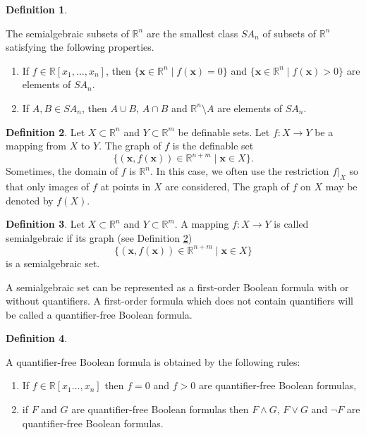 \documentclass[
]{book}
\providecommand{\tightlist}{%
  \setlength{\itemsep}{0pt}\setlength{\parskip}{0pt}}
\theoremstyle{definition}
\newtheorem{definition}{Definition}[chapter]
\theoremstyle{definition}
\theoremstyle{definition}
\theoremstyle{definition}
\theoremstyle{remark}
\begin{document}
\begin{definition}
\protect\hypertarget{def:semialgebraic-set}{}\label{def:semialgebraic-set}

The semialgebraic subsets of \(\mathbb{R}^n\) are the smallest class \({SA}_n\) of subsets of \(\mathbb{R}^n\) satisfying the following properties.

\begin{enumerate}
\def\labelenumi{\arabic{enumi}.}
\tightlist
\item
  If \(f \in \mathbb{R}[x_1,\ldots,x_n]\), then \(\{ \mathbf{x} \in \mathbb{R}^n \mid f(\mathbf{x}) = 0 \}\) and \(\{ \mathbf{x} \in \mathbb{R}^n \mid f(\mathbf{x}) > 0 \}\) are elements of \({SA}_n\).
\item
  If \(A, B \in {SA}_n\), then \(A \cup B\), \(A \cap B\) and \(\mathbb{R}^n \setminus A\) are elements of \({SA}_n\).
\end{enumerate}

\end{definition}

\begin{definition}
\protect\hypertarget{def:graph-def-map}{}\label{def:graph-def-map}Let \(X \subset \mathbb{R}^n\) and \(Y \subset \mathbb{R}^m\) be definable sets.
Let \(f : X \to Y\) be a mapping from \(X\) to \(Y\). The graph of \(f\) is the definable set
\[
\{ (\mathbf{x},f(\mathbf{x})) \in \mathbb{R}^{n+m} \mid \mathbf{x} \in X \}.
\]
Sometimes, the domain of \(f\) is \(\mathbb{R}^n\). In this case, we often use the restriction \(f\vert_X\) so that only images of \(f\) at points in \(X\) are considered,
The graph of \(f\) on \(X\) may be denoted by \(f(X)\).
\end{definition}

\begin{definition}
Let \(X \subset \mathbb{R}^n\) and \(Y \subset \mathbb{R}^m\). A mapping \(f : X \to Y\) is called semialgebraic if its graph (see Definition \ref{def:graph-def-map})
\[
\{ (\mathbf{x},f(\mathbf{x})) \in \mathbb{R}^{n+m} \mid \mathbf{x} \in X \}
\]
is a semialgebraic set.
\end{definition}

A semialgebraic set can be represented as a first-order Boolean formula with or without quantifiers. A first-order formula which does not contain quantifiers will be called a quantifier-free Boolean formula.

\begin{definition}
\protect\hypertarget{def:qff}{}\label{def:qff}

A quantifier-free Boolean formula is obtained by the following rules:

\begin{enumerate}
\def\labelenumi{\arabic{enumi}.}
\tightlist
\item
  If \(f \in \mathbb{R}[x_1\ldots,x_n]\) then \(f=0\) and \(f>0\) are quantifier-free Boolean formulas,
\item
  if \(F\) and \(G\) are quantifier-free Boolean formulas then \(F \land G\), \(F \lor G\) and \(\neg F\) are quantifier-free Boolean formulas.
\end{enumerate}

\end{definition}
\end{document}
